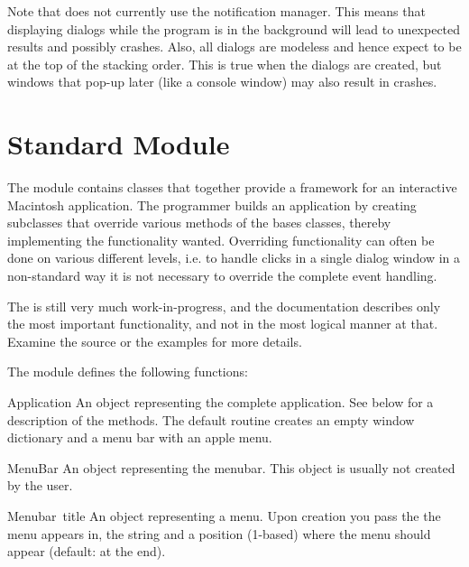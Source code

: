 Note that  does not currently use the notification
manager. This means that displaying dialogs while the program is in
the background will lead to unexpected results and possibly
crashes. Also, all dialogs are modeless and hence expect to be at the
top of the stacking order. This is true when the dialogs are created,
but windows that pop-up later (like a console window) may also result
in crashes.


\section{Standard Module }
\label{module-FrameWork}

The  module contains classes that together provide a
framework for an interactive Macintosh application. The programmer
builds an application by creating subclasses that override various
methods of the bases classes, thereby implementing the functionality
wanted. Overriding functionality can often be done on various
different levels, i.e. to handle clicks in a single dialog window in a
non-standard way it is not necessary to override the complete event
handling.

The  is still very much work-in-progress, and the
documentation describes only the most important functionality, and not
in the most logical manner at that. Examine the source or the examples
for more details.

The  module defines the following functions:

\renewcommand{\indexsubitem}{(in module FrameWork)}

\begin{funcdesc}{Application}{}
An object representing the complete application. See below for a
description of the methods. The default  routine
creates an empty window dictionary and a menu bar with an apple menu.
\end{funcdesc}

\begin{funcdesc}{MenuBar}{}
An object representing the menubar. This object is usually not created
by the user.
\end{funcdesc}

\begin{funcdesc}{Menu}{bar\, title}
An object representing a menu. Upon creation you pass the
 the menu appears in, the  string and a
position (1-based)  where the menu should appear (default:
at the end).
\end{funcdesc}

